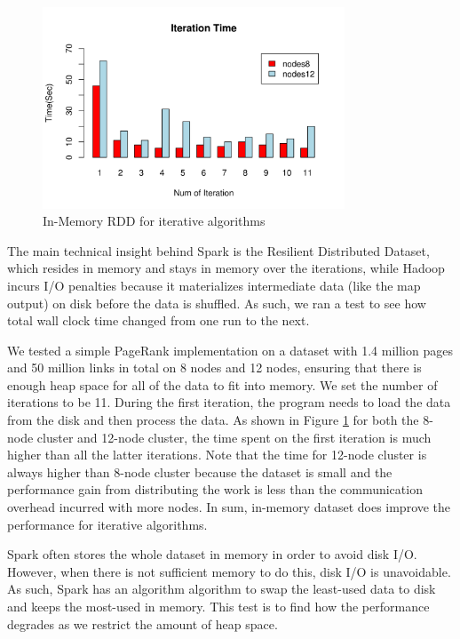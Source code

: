 \documentclass{article}
\begin{document}
\begin{figure}[H]
        \centering
        \includegraphics[width=90mm]{images/in-mem.png}
        \caption{In-Memory RDD for iterative algorithms}
        \label{fig:in-memory}
    \end{figure}

The main technical insight behind Spark is the Resilient Distributed Dataset,
which resides in memory and stays in memory over the iterations, while Hadoop
incurs I/O penalties because it materializes intermediate data (like the map
output) on disk before the data is shuffled. As such, we ran a test to see
how total wall clock time changed from one run to the next.

We tested a simple PageRank implementation on a dataset with 1.4 million pages
and 50 million links in total on 8 nodes and 12 nodes, ensuring that there
is enough heap space for all of the data to fit into memory. We set
the number of iterations to be 11. During the first iteration, the program
needs to load the data from the disk and then process the data. As shown in
Figure \ref{fig:in-memory} for both the 8-node cluster and 12-node cluster, the
time spent on the first iteration is much higher than all the latter
iterations. Note that the time for 12-node cluster is always
higher than 8-node cluster because the dataset is small and the performance
gain from distributing the work is less than the communication overhead
incurred with more nodes. In sum, in-memory dataset does improve the
performance for iterative algorithms.

Spark often stores the whole dataset in memory in order to avoid disk I/O.
However, when there is not sufficient memory to do this, disk I/O is
unavoidable.  As such, Spark has an algorithm algorithm to swap the least-used
data to disk and keeps the most-used in memory. This test is to find how
the performance degrades as we restrict the amount of heap space.
\end{document}
